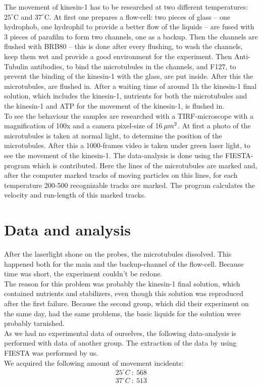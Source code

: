 \documentclass[english, %
parskip=full, %
bibliography=totoc, %
draft, %
]{scrartcl}
\begin{document}
The movement of kinesin-1 has to be researched at two different temperatures: $25^\circ\text{C}$ and $37^\circ\text{C}$.
At first one prepares a flow-cell: two pieces of glass – one hydrophob, one hydrophil to provide a better flow of the liquids – are fused with 3 pieces of parafilm to form two channels, one as a backup. Then the channels are flushed with BRB80 – this is done after every flushing, to wash the channels, keep them wet and provide a good environment for the experiment. Then Anti-Tubulin antibodies, to bind the microtubules in the channels, and F127, to prevent the binding of the kinesin-1 with the glass, are put inside. After this the microtubules, are flushed in. After a waiting time of around 1h the kinesin-1 final solution, which includes the kinesin-1, nutrients for both the microtubules and the kinesin-1 and ATP for the movement of the kinesin-1, is flushed in.\\
To see the behaviour the samples are researched with a TIRF-microscope with a magnification of 100x and a camera pixel-size of 16\,$\mu m\textsuperscript{2}$. At first a photo of the microtubules is taken at normal light, to determine the position of the microtubules. After this a 1000-frames video is taken under green laser light, to see the movement of the kinesin-1. The data-analysis is done using the FIESTA-program which is contributed. Here the lines of the microtubules are marked and, after the computer marked tracks of moving particles on this lines, for each temperature 200-500 recognizable tracks are marked. The program calculates the velocity and run-length of this marked tracks.

\section{Data and analysis}

After the laserlight shone on the probes, the microtubules dissolved. This happened both for the main and the backup-channel of the flow-cell. Because time was short, the experiment couldn't be redone.\\
The reason for this problem was probably the kinesin-1 final solution, which contained nutrients and stabilizers, even though this solution was reproduced after the first failure. Because the second group, which did their experiment on the same day, had the same problems, the basic liquids for the solution were probably tarnished. \\
As we had no experimental data of ourselves, the following data-analysis is performed with data of another group. The extraction of the data by using FIESTA was performed by us. \\
We acquired the following amount of movement incidents: 
\begin{align*}
25^\circ C \ : \ 568 \\
37^\circ C \ : \ 513
\end{align*}
\end{document}
